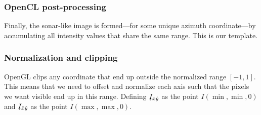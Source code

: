 \subsubsection{OpenCL post-processing}

Finally, the sonar-like image is formed---for some unique azimuth coordinate---by accumulating all intensity values that share the same range. This is our template. %








\subsubsection{Normalization and clipping}

OpenGL clips any coordinate that end up outside the normalized range $[-1,1]$. This means that we need to offset and normalize each axis such that the pixels we want visible end up in this range.
Defining $\udot{I}_{\hat{x}\hat{y}}$ as the point $I(\min,\min,0)$ and $\udot{I}_{\check{x}\check{y}}$ as the point $I(\max,\max,0)$.


